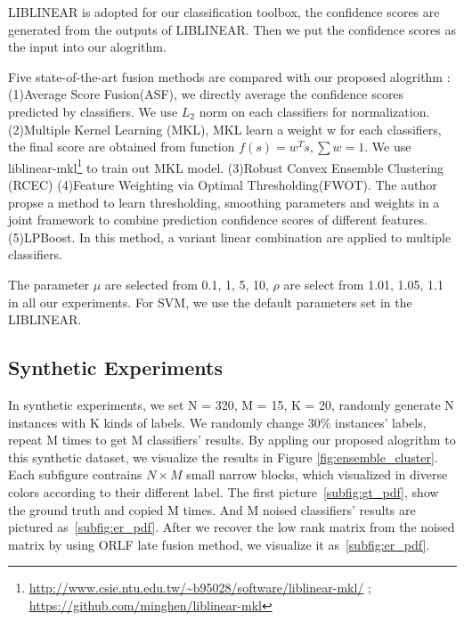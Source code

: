 \documentclass[letterpaper]{article}
\begin{document}
LIBLINEAR\cite{fan2008liblinear} is adopted for our classification toolbox, the confidence scores are generated from the outputs of LIBLINEAR. Then we put the confidence scores as the input into our alogrithm.

Five state-of-the-art fusion methods are compared with our proposed alogrithm : (1)Average Score Fusion(ASF), we directly average the confidence scores predicted by classifiers. We use $L_2$ norm on each classifiers for normalization. (2)Multiple Kernel Learning (MKL),  MKL learn a weight w for each classifiers, the final score are obtained from function $f(s)=w^{T}s, \sum w = 1$. We use liblinear-mkl\footnote{\url{http://www.csie.ntu.edu.tw/~b95028/software/liblinear-mkl/} ; \url{https://github.com/minghen/liblinear-mkl}} to train out MKL model. (3)Robust Convex Ensemble Clustering (RCEC)\cite{gaoijcai2016robust} (4)Feature Weighting via Optimal Thresholding(FWOT)\cite{xuiccv2013feature}. The author propse a method to learn thresholding, smoothing parameters and weights in a joint framework to combine prediction confidence scores of different features. (5)LPBoost\cite{gehler2009feature}. In this method, a variant linear combination are applied to multiple classifiers.

The parameter $\mu$ are selected from {0.1, 1, 5, 10}, $\rho$ are select from {1.01, 1.05, 1.1} in all our experiments. For SVM, we use the default parameters set in the LIBLINEAR.

\subsection{Synthetic Experiments}

In synthetic experiments, we set N = 320, M = 15, K = 20, randomly generate N instances with K kinds of labels. We randomly change 30\% instances' labels, repeat M times to get M classifiers' results. By appling our proposed alogrithm to this synthetic dataset, we visualize the results in Figure \ref{fig:ensemble_cluster}. Each subfigure contrains $N\times M$ small narrow blocks, which visualized in diverse colors according to their different label. The first picture~\ref{subfig:gt_pdf}, show the ground truth and copied M times. And M noised classifiers' results are pictured as~\ref{subfig:er_pdf}. After we recover the low rank matrix from the noised matrix by using ORLF late fusion method, we visualize it as~\ref{subfig:er_pdf}.
\end{document}
